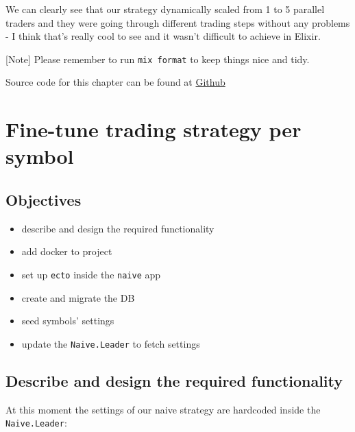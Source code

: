 \documentclass[
]{book}
\providecommand{\tightlist}{%
  \setlength{\itemsep}{0pt}\setlength{\parskip}{0pt}}
\begin{document}
We can clearly see that our strategy dynamically scaled from 1 to 5 parallel traders and they were going through different trading steps without any problems - I think that's really cool to see and it wasn't difficult to achieve in Elixir.

{[}Note{]} Please remember to run \texttt{mix\ format} to keep things nice and tidy.

Source code for this chapter can be found at \href{https://github.com/frathon/create-a-cryptocurrency-trading-bot-in-elixir-source-code/tree/chapter_09}{Github}

\hypertarget{fine-tune-trading-strategy-per-symbol}{%
\chapter{Fine-tune trading strategy per symbol}\label{fine-tune-trading-strategy-per-symbol}}

\hypertarget{objectives-9}{%
\section{Objectives}\label{objectives-9}}

\begin{itemize}
\tightlist
\item
  describe and design the required functionality
\item
  add docker to project
\item
  set up \texttt{ecto} inside the \texttt{naive} app
\item
  create and migrate the DB
\item
  seed symbols' settings
\item
  update the \texttt{Naive.Leader} to fetch settings
\end{itemize}

\hypertarget{describe-and-design-the-required-functionality-1}{%
\section{Describe and design the required functionality}\label{describe-and-design-the-required-functionality-1}}

At this moment the settings of our naive strategy are hardcoded inside the \texttt{Naive.Leader}:
\end{document}
